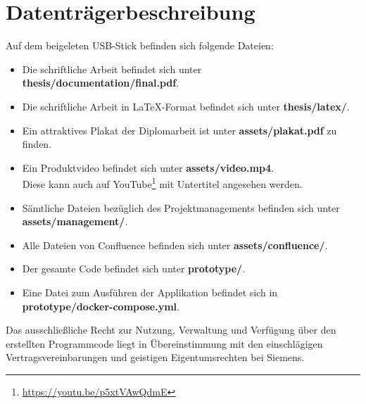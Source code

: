 \section{Datenträgerbeschreibung}

Auf dem beigeleten USB-Stick befinden sich folgende Dateien:

\begin{itemize}
    \item Die schriftliche Arbeit befindet sich unter \textbf{thesis/documentation/final.pdf}.
    \item Die schriftliche Arbeit in \LaTeX-Format befindet sich unter \textbf{thesis/latex/}.
    \item Ein attraktives Plakat der Diplomarbeit ist unter \textbf{assets/plakat.pdf} zu finden.
    \item Ein Produktvideo befindet sich unter \textbf{assets/video.mp4}. \\ Diese kann auch auf YouTube\footnote{\url{https://youtu.be/p5xtVAwQdmE}} mit Untertitel angesehen werden.
    \item Sämtliche Dateien bezüglich des Projektmanagements befinden sich unter \textbf{assets/management/}.
    \item Alle Dateien von Confluence befinden sich unter \textbf{assets/confluence/}.
    \item Der gesamte Code befindet sich unter \textbf{prototype/}.
    \item Eine Datei zum Ausführen der Applikation befindet sich in \textbf{prototype/docker-compose.yml}.
\end{itemize}

Das ausschließliche Recht zur Nutzung, Verwaltung und Verfügung über den erstellten Programmcode liegt in Übereinstimmung mit den einschlägigen Vertragsvereinbarungen und geistigen Eigentumsrechten bei Siemens.